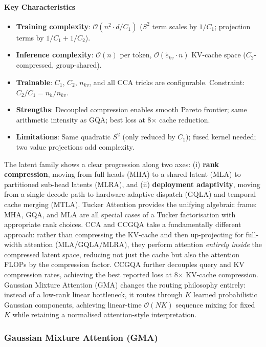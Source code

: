 \paragraph{Key Characteristics}
\begin{itemize}[leftmargin=*]
    \item \textbf{Training complexity}: $\mathcal{O}(n^2 \cdot d / C_1)$ ($S^2$ term scales by $1/C_1$; projection terms by $1/C_1 + 1/C_2$).
    \item \textbf{Inference complexity}: $\mathcal{O}(n)$ per token, $\mathcal{O}(\tilde{e}_{kv} \cdot n)$ KV-cache space ($C_2$-compressed, group-shared).
    \item \textbf{Trainable}: $C_1$, $C_2$, $n_{kv}$, and all CCA tricks are configurable. Constraint: $C_2/C_1 = n_h/n_{kv}$.
    \item \textbf{Strengths}: Decoupled compression enables smooth Pareto frontier; same arithmetic intensity as GQA; best loss at 8$\times$ cache reduction.
    \item \textbf{Limitations}: Same quadratic $S^2$ (only reduced by $C_1$); fused kernel needed; two value projections add complexity.
\end{itemize}

The latent family shows a clear progression along two axes: (i) \textbf{rank compression}, moving from full heads (MHA) to a shared latent (MLA) to partitioned sub-head latents (MLRA), and (ii) \textbf{deployment adaptivity}, moving from a single decode path to hardware-adaptive dispatch (GQLA) and temporal cache merging (MTLA). Tucker Attention provides the unifying algebraic frame: MHA, GQA, and MLA are all special cases of a Tucker factorisation with appropriate rank choices. CCA and CCGQA take a fundamentally different approach: rather than compressing the KV-cache and then up-projecting for full-width attention (MLA/GQLA/MLRA), they perform attention \emph{entirely inside} the compressed latent space, reducing not just the cache but also the attention FLOPs by the compression factor. CCGQA further decouples query and KV compression rates, achieving the best reported loss at 8$\times$ KV-cache compression. Gaussian Mixture Attention (GMA) changes the routing philosophy entirely: instead of a low-rank linear bottleneck, it routes through $K$ learned probabilistic Gaussian components, achieving linear-time $\mathcal{O}(NK)$ sequence mixing for fixed $K$ while retaining a normalised attention-style interpretation.

\subsubsection{Gaussian Mixture Attention (GMA)}

